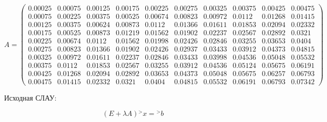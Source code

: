 \documentclass[a4paper, 12pt]{extarticle}
\begin{document}
\begin{equation}
    A = \begin{pmatrix}
        0.00025 & 0.00075 & 0.00125 & 0.00175 & 0.00225 & 0.00275 & 0.00325 & 0.00375 & 0.00425 & 0.00475 \\ 
        0.00075 & 0.00225 & 0.00375 & 0.00525 & 0.00674 & 0.00823 & 0.00972 & 0.0112 & 0.01268 & 0.01415 \\ 
        0.00125 & 0.00375 & 0.00624 & 0.00873 & 0.0112 & 0.01366 & 0.01611 & 0.01853 & 0.02094 & 0.02332 \\ 
        0.00175 & 0.00525 & 0.00873 & 0.01219 & 0.01562 & 0.01902 & 0.02237 & 0.02567 & 0.02892 & 0.0321 \\ 
        0.00225 & 0.00674 & 0.0112 & 0.01562 & 0.01998 & 0.02426 & 0.02846 & 0.03255 & 0.03653 & 0.0404 \\ 
        0.00275 & 0.00823 & 0.01366 & 0.01902 & 0.02426 & 0.02937 & 0.03433 & 0.03912 & 0.04373 & 0.04815 \\ 
        0.00325 & 0.00972 & 0.01611 & 0.02237 & 0.02846 & 0.03433 & 0.03998 & 0.04536 & 0.05048 & 0.05532 \\ 
        0.00375 & 0.0112 & 0.01853 & 0.02567 & 0.03255 & 0.03912 & 0.04536 & 0.05124 & 0.05675 & 0.06191 \\ 
        0.00425 & 0.01268 & 0.02094 & 0.02892 & 0.03653 & 0.04373 & 0.05048 & 0.05675 & 0.06257 & 0.06793 \\ 
        0.00475 & 0.01415 & 0.02332 & 0.0321 & 0.0404 & 0.04815 & 0.05532 & 0.06191 & 0.06793 & 0.07342 
    \end{pmatrix}
\end{equation}

Исходная СЛАУ: 

\begin{equation}
    (E + \lambda A) {^>x} = {^>b}
\end{equation}
\end{document}
